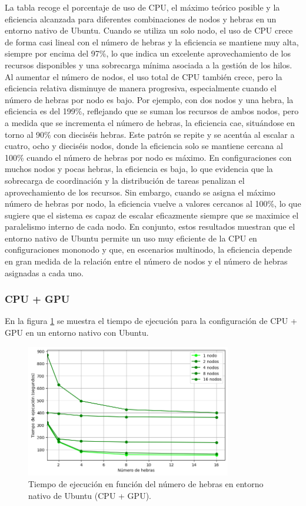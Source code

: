 La tabla recoge el porcentaje de uso de CPU, el máximo teórico posible y la eficiencia alcanzada para diferentes combinaciones de nodos y hebras en un entorno nativo de Ubuntu. Cuando se utiliza un solo nodo, el uso de CPU crece de forma casi lineal con el número de hebras y la eficiencia se mantiene muy alta, siempre por encima del 97\%, lo que indica un excelente aprovechamiento de los recursos disponibles y una sobrecarga mínima asociada a la gestión de los hilos. Al aumentar el número de nodos, el uso total de CPU también crece, pero la eficiencia relativa disminuye de manera progresiva, especialmente cuando el número de hebras por nodo es bajo. Por ejemplo, con dos nodos y una hebra, la eficiencia es del 199\%, reflejando que se suman los recursos de ambos nodos, pero a medida que se incrementa el número de hebras, la eficiencia cae, situándose en torno al 90\% con dieciséis hebras. Este patrón se repite y se acentúa al escalar a cuatro, ocho y dieciséis nodos, donde la eficiencia solo se mantiene cercana al 100\% cuando el número de hebras por nodo es máximo. En configuraciones con muchos nodos y pocas hebras, la eficiencia es baja, lo que evidencia que la sobrecarga de coordinación y la distribución de tareas penalizan el aprovechamiento de los recursos. Sin embargo, cuando se asigna el máximo número de hebras por nodo, la eficiencia vuelve a valores cercanos al 100\%, lo que sugiere que el sistema es capaz de escalar eficazmente siempre que se maximice el paralelismo interno de cada nodo. En conjunto, estos resultados muestran que el entorno nativo de Ubuntu permite un uso muy eficiente de la CPU en configuraciones mononodo y que, en escenarios multinodo, la eficiencia depende en gran medida de la relación entre el número de nodos y el número de hebras asignadas a cada uno.

\subsubsection{CPU + GPU}

En la figura \ref{fig:thread_sweep_ubuntu_gpu_native_time} se muestra el tiempo de ejecución para la configuración de CPU + GPU en un entorno nativo con Ubuntu.

\begin{figure}[H]
    \centering
    \includegraphics[width=0.8\textwidth]{imagenes/cap5/thread_sweep_ubuntu_gpu_native_time.png}
    \caption{Tiempo de ejecución en función del número de hebras en entorno nativo de Ubuntu (CPU + GPU).}
    \label{fig:thread_sweep_ubuntu_gpu_native_time}
\end{figure}


